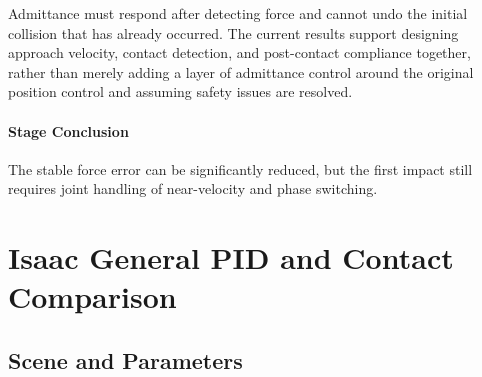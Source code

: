 
Admittance must respond after detecting force and cannot undo the initial collision that has already occurred. The current results support designing approach velocity, contact detection, and post-contact compliance together, rather than merely adding a layer of admittance control around the original position control and assuming safety issues are resolved.


\paragraph{Stage Conclusion} The stable force error can be significantly reduced, but the first impact still requires joint handling of near-velocity and phase switching.




\FloatBarrier

\section{Isaac General PID and Contact Comparison}

\label{stage:s11}

\subsection{Scene and Parameters}\label{s11-detail-1}


